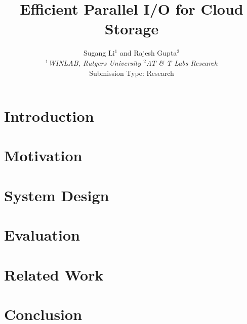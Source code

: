 \documentclass[10pt,twocolumn]{article}
\begin{document}
\title{Efficient Parallel I/O for Cloud Storage}
\author{Sugang Li$^1$ and Rajesh Gupta$^2$ \\
\small {\em  $^1$WINLAB, Rutgers University \quad
          $^2$AT \& T Labs Research} \\ [2mm]
\small Submission Type: Research
}
\date{}
\maketitle

\begin{abstract}

\end{abstract}

\section{Introduction}

\label{sec:intro}

\section{Motivation}

\label{sec:moti}

\section{System Design}

\label{sec:sys}

\section{Evaluation}

\label{sec:eval}

\section{Related Work}

\label{sec:related}

\section{Conclusion}

\label{sec:conclusion}



\end{document}
